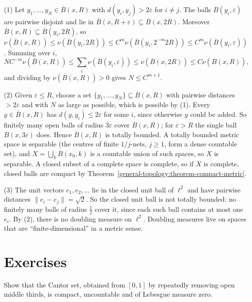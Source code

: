 \begin{solution}
(1) Let $y_1, \ldots, y_N \in \overline{B}(x, R)$ with $d(y_i, y_j) > 2\varepsilon$ for $i \neq j$. The balls $\overline{B}(y_i, \varepsilon)$ are pairwise disjoint and lie in $\overline{B}(x, R + \varepsilon) \subseteq \overline{B}(x, 2R)$.
Moreover $\overline{B}(x, R) \subseteq \overline{B}(y_i, 2R)$, so
$\nu(\overline{B}(x, R)) \leq \nu(\overline{B}(y_i, 2R)) \leq C^m\nu(\overline{B}(y_i, 2^{-m}2R)) \leq C^m\nu(\overline{B}(y_i, \varepsilon))$. Summing over $i$,
\[
NC^{-m}\nu(\overline{B}(x, R)) \leq \sum_i\nu(\overline{B}(y_i, \varepsilon)) \leq \nu(\overline{B}(x, 2R)) \leq C\nu(\overline{B}(x, R)),
\]
and dividing by $\nu(\overline{B}(x, R)) > 0$ gives $N \leq C^{m+1}$.

(2) Given $\varepsilon \leq R$, choose a set $\{y_1, \ldots, y_N\} \subseteq \overline{B}(x, R)$ with pairwise distances $> 2\varepsilon$ and with $N$ as large as possible, which is possible by (1). Every
$y \in \overline{B}(x, R)$ has $d(y, y_i) \leq 2\varepsilon$ for some $i$, since otherwise $y$ could be added. So finitely many open balls of radius $3\varepsilon$ cover $\overline{B}(x, R)$; for
$\varepsilon > R$ the single ball $B(x, 3\varepsilon)$ does. Hence $\overline{B}(x, R)$ is totally bounded. A totally bounded metric space is separable (the centres of finite $1/j$-nets, $j \geq 1$, form a
dense countable set), and $X = \bigcup_k\overline{B}(x_0, k)$ is a countable union of such spaces, so $X$ is separable. A closed subset of a complete space is complete, so if $X$ is complete, closed balls
are compact by Theorem~\ref{general-topology:theorem-compact-metric}.

(3) The unit vectors $e_1, e_2, \ldots$ lie in the closed unit ball of $\ell^2$ and have pairwise distances $\|e_i - e_j\| = \sqrt2$. So the closed unit ball is not totally bounded: no finitely many balls of
radius $\frac12$ cover it, since each such ball contains at most one $e_i$. By (2), there is no doubling measure on $\ell^2$. Doubling measures live on spaces that are ``finite-dimensional'' in a metric sense.
\end{solution}

\section{Exercises}\label{measure-theory:section-exercises}

\begin{exercise}\label{measure-theory:exercise-cantor}
Show that the Cantor set, obtained from $[0, 1]$ by repeatedly removing open middle thirds, is compact, uncountable and of Lebesgue measure zero.
\end{exercise}

